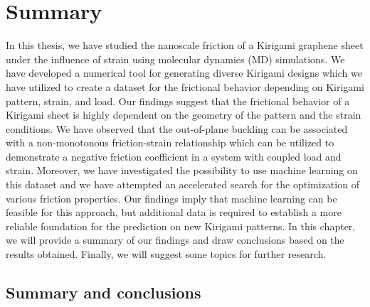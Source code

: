 \chapter{Summary}\label{chap:summary}
In this thesis, we have studied the nanoscale friction of a Kirigami graphene
sheet under the influence of strain using molecular dynamics (\acrshort{MD})
simulations. We have developed a numerical tool for generating diverse Kirigami
designs which we have utilized to create a dataset for the frictional behavior
depending on Kirigami pattern, strain, and load. Our findings suggest that
the frictional behavior of a Kirigami sheet is highly dependent on the geometry
of the pattern and the strain conditions. We have observed that the out-of-plane
buckling can be associated with a non-monotonous friction-strain relationship which
can be utilized to demonstrate a negative friction coefficient in a system with
coupled load and strain. Moreover, we have investigated the possibility to use
machine learning on this dataset and we have attempted an accelerated search for
the optimization of various friction properties. Our findings imply that machine
learning can be feasible for this approach, but additional data is required to
establish a more reliable foundation for the prediction on new Kirigami
patterns. In this chapter, we will provide a summary of our findings and draw
conclusions based on the results obtained. Finally, we will suggest some topics
for further research.


\section{Summary and conclusions}

